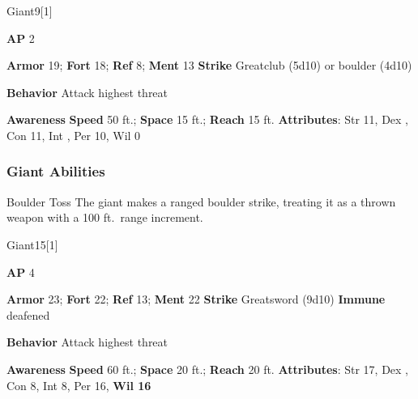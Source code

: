 \begin{monsection}[Stone]{Giant}{9}[1]
\vspace{-1em}\vspace{-1em}
\begin{spellcontent}
\begin{spelltargetinginfo}
{\textbf{AP} 2}

\pari \textbf{Armor} 19;
\textbf{Fort} 18;
\textbf{Ref} 8;
\textbf{Ment} 13
\pari \textbf{Strike} Greatclub  (5d10) or boulder  (4d10)



\pari \textbf{Behavior} Attack highest threat
\end{spelltargetinginfo}
\end{spellcontent}

\begin{monsterfooter}
\pari \textbf{Awareness} 
\pari \textbf{Speed} 50 ft.;
\textbf{Space} 15 ft.;
\textbf{Reach} 15 ft.
\pari \textbf{Attributes}:
Str 11,
Dex ,
Con 11,
Int ,
Per 10,
Wil 0
\end{monsterfooter}
\end{monsection}


\subsubsection{Giant Abilities}

\begin{ability}{Boulder Toss}
The giant makes a ranged boulder strike, treating it as a thrown weapon with a 100 ft.\ range increment.
\end{ability}






\begin{monsection}[Storm]{Giant}{15}[1]
\vspace{-1em}\vspace{-1em}
\begin{spellcontent}
\begin{spelltargetinginfo}
{\textbf{AP} 4}

\pari \textbf{Armor} 23;
\textbf{Fort} 22;
\textbf{Ref} 13;
\textbf{Ment} 22
\pari \textbf{Strike} Greatsword  (9d10)
\pari \textbf{Immune} deafened


\pari \textbf{Behavior} Attack highest threat
\end{spelltargetinginfo}
\end{spellcontent}

\begin{monsterfooter}
\pari \textbf{Awareness} 
\pari \textbf{Speed} 60 ft.;
\textbf{Space} 20 ft.;
\textbf{Reach} 20 ft.
\pari \textbf{Attributes}:
Str 17,
Dex ,
Con 8,
Int 8,
Per 16,
\textbf{Wil 16}
\end{monsterfooter}
\end{monsection}


